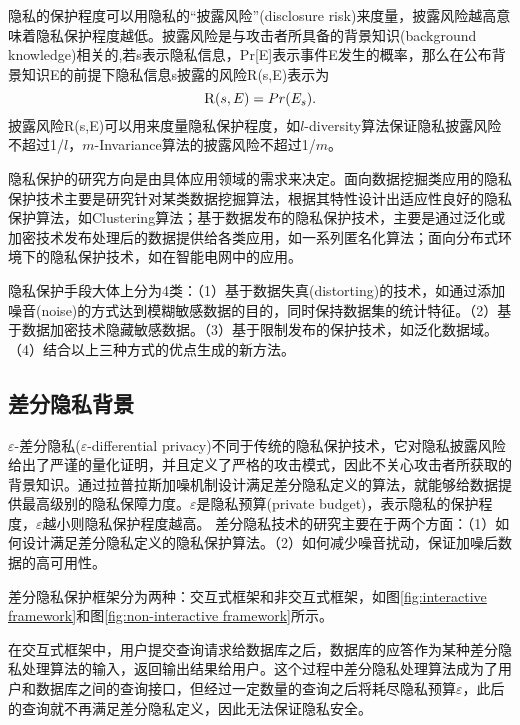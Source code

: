 隐私的保护程度可以用隐私的“披露风险”(disclosure risk)\cite{l-diversity}来度量，披露风险越高意味着隐私保护程度越低。披露风险是与攻击者所具备的背景知识(background knowledge)相关的\cite{面向数据库应用的隐私保护研究综述},若s表示隐私信息，Pr[E]表示事件E发生的概率，那么在公布背景知识E的前提下隐私信息s披露的风险\textsc{R}(s,E)表示为
\[
	\textsc{R}(s,E) = Pr(E_{s}).
\]
披露风险\textsc{R}(s,E)可以用来度量隐私保护程度，如$l$-diversity算法\cite{l-diversity}保证隐私披露风险不超过1/$l$，$m$-Invariance算法\cite{m-Invariance}的披露风险不超过1/$m$。

隐私保护的研究方向是由具体应用领域的需求来决定。面向数据挖掘类应用的隐私保护技术主要是研究针对某类数据挖掘算法，根据其特性设计出适应性良好的隐私保护算法，如Clustering\cite{clustering}算法；基于数据发布的隐私保护技术，主要是通过泛化或加密技术发布处理后的数据提供给各类应用，如一系列匿名化算法\cite{multidimensional k anonymity}；面向分布式环境下的隐私保护技术，如在智能电网中的应用\cite{Distributed Privacy}。

隐私保护手段大体上分为4类\cite{面向数据库应用的隐私保护研究综述}：（1）基于数据失真(distorting)的技术，如通过添加噪音(noise)的方式达到模糊敏感数据的目的，同时保持数据集的统计特征。（2）基于数据加密技术隐藏敏感数据。（3）基于限制发布的保护技术，如泛化数据域。（4）结合以上三种方式的优点生成的新方法。


\subsection{差分隐私背景} %

$\varepsilon$-差分隐私($\varepsilon$-differential privacy)\cite{Dwork Calibrating}不同于传统的隐私保护技术，它对隐私披露风险给出了严谨的量化证明，并且定义了严格的攻击模式，因此不关心攻击者所获取的背景知识。通过拉普拉斯加噪机制\cite{Dwork Calibrating}设计满足差分隐私定义的算法，就能够给数据提供最高级别的隐私保障力度。$\varepsilon$是隐私预算(private budget)，表示隐私的保护程度，$\varepsilon$越小则隐私保护程度越高。
差分隐私技术的研究主要在于两个方面：（1）如何设计满足差分隐私定义的隐私保护算法。（2）如何减少噪音扰动，保证加噪后数据的高可用性。

差分隐私保护框架分为两种：交互式框架和非交互式框架，如图\ref{fig:interactive framework}和图\ref{fig:non-interactive framework}所示。

在交互式框架中，用户提交查询请求给数据库之后，数据库的应答作为某种差分隐私处理算法的输入，返回输出结果给用户。这个过程中差分隐私处理算法成为了用户和数据库之间的查询接口，但经过一定数量的查询之后将耗尽隐私预算$\varepsilon$，此后的查询就不再满足差分隐私定义，因此无法保证隐私安全。

